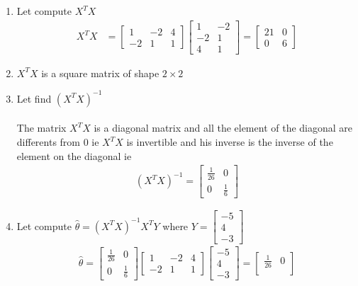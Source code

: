 \documentclass[12pt,a4paper]{article}
\begin{document}
\begin{enumerate}
	\item Let compute $X^{T}X$
	\begin{align}
		X^{T}X &= \begin{bmatrix}
			1&-2&4\\
			-2&1&1
		\end{bmatrix}\begin{bmatrix}
		1&-2\\
		-2&1\\
		4&1
	\end{bmatrix}
 = \begin{bmatrix}
	21&0\\
	0&6
\end{bmatrix}
	\end{align}
\item $X^{T}X$ is a square matrix of shape $2\times2$
\item Let find $(X^{T}X)^{-1}$\\\\
The matrix $X^{T}X$ is a diagonal matrix and all the element of the diagonal are differents from 0 ie $X^{T}X$ is invertible and his inverse is the inverse of the element on the diagonal ie \begin{align}
	(X^{T}X)^{-1} = \begin{bmatrix}
		\frac{1}{26}&0\\
		0&\frac{1}{6}
	\end{bmatrix}
\end{align}
\item Let compute $\hat\theta =(X^{T}X)^{-1}X^{T}Y $ where $Y=\begin{bmatrix}
	-5\\
	4\\
	-3
\end{bmatrix}$\\
\begin{align}
  \hat{\theta} = \begin{bmatrix}
  	\frac{1}{26}&0\\
  	0&\frac{1}{6}
  \end{bmatrix}\begin{bmatrix}
  1&-2&4\\
  -2&1&1
\end{bmatrix}\begin{bmatrix}
-5\\
4\\
-3
\end{bmatrix} =\begin{bmatrix}
\frac{1}{26}&0\\

\end{bmatrix}
\end{align}
\end{enumerate}
\end{document}

